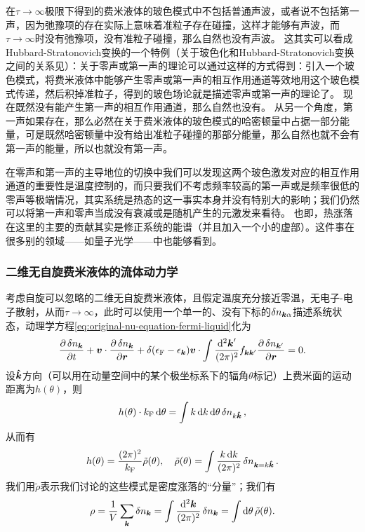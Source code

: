 在$\tau \to \infty$极限下得到的费米液体的玻色模式中不包括普通声波，或者说不包括第一声，因为弛豫项的存在实际上意味着准粒子存在碰撞，这样才能够有声波，而$\tau \to \infty$时没有弛豫项，没有准粒子碰撞，那么自然也没有声波。
这其实可以看成Hubbard-Stratonovich变换的一个特例（关于玻色化和Hubbard-Stratonovich变换之间的关系见\cite{hs-bosonization}）：关于零声或第一声的理论可以通过这样的方式得到：引入一个玻色模式，将费米液体中能够产生零声或第一声的相互作用通道等效地用这个玻色模式传递，然后积掉准粒子，得到的玻色场论就是描述零声或第一声的理论了。
现在既然没有能产生第一声的相互作用通道，那么自然也没有。
从另一个角度，第一声如果存在，那么必然在关于费米液体的玻色模式的哈密顿量中占据一部分能量，可是既然哈密顿量中没有给出准粒子碰撞的那部分能量，那么自然也就不会有第一声的能量，所以也就没有第一声。

在零声和第一声的主导地位的切换中我们可以发现这两个玻色激发对应的相互作用通道的重要性是温度控制的，而只要我们不考虑频率较高的第一声或是频率很低的零声等极端情况，其实系统是热态的这一事实本身并没有特别大的影响；我们仍然可以将第一声和零声当成没有衰减或是随机产生的元激发来看待。
也即，热涨落在这里的主要的贡献其实是修正系统的能谱（并且加入一个小的虚部）。这件事在很多别的领域——如量子光学——中也能够看到。

\subsubsection{二维无自旋费米液体的流体动力学}

考虑自旋可以忽略的二维无自旋费米液体，且假定温度充分接近零温，无电子-电子散射，从而$\tau \to \infty$，此时可以使用一个单一的、没有下标的$\var{n_{\vb*{k} \alpha}}$描述系统状态，动理学方程\eqref{eq:original-nu-equation-fermi-liquid}化为
\begin{equation}
    \pdv{\var{n_{\vb*{k}}}}{t} + \vb*{v} \cdot \pdv{\var{n_{\vb*{k}}}}{\vb*{r}} + \delta(\epsilon_\text{F} - \epsilon_{\vb*{k}}) \vb*{v} \cdot \int \frac{\dd[2]{\vb*{k}'}}{(2\pi)^2} {f}_{\vb*{k} \vb*{k}'} \pdv{\var{{n}_{\vb*{k}'}}}{\vb*{r}} = 0.
    \label{eq:spinless-fermion-liquid-delta-varn-eq}
\end{equation}
设$\vu*{k}$方向（可以用在动量空间中的某个极坐标系下的辐角$\theta$标记）上费米面的运动距离为$h(\theta)$，则
\[
    h(\theta) \cdot k_\text{F} \dd{\theta} = \int k \dd{k} \dd{\theta} \var{n}_{k \vu*{k}},
\]
从而有
\begin{equation}
    h(\theta) = \frac{(2\pi)^2}{k_\text{F}} \tilde{\rho}(\theta) , \quad \tilde{\rho}(\theta) = \int \frac{k \dd{k}}{(2\pi)^2} \var{n}_{\vb*{k} = k \vu*{k}}.
\end{equation}
我们用$\tilde{\rho}$表示我们讨论的这些模式是密度涨落的“分量”；我们有
\begin{equation}
    \rho = \frac{1}{V} \sum_{\vb*{k}} \var{n}_{\vb*{k}} = \int \frac{\dd[2]{\vb*{k}}}{(2\pi)^2} \var{n}_{\vb*{k}} = \int \dd{\theta} \tilde{\rho}(\theta).
\end{equation}

